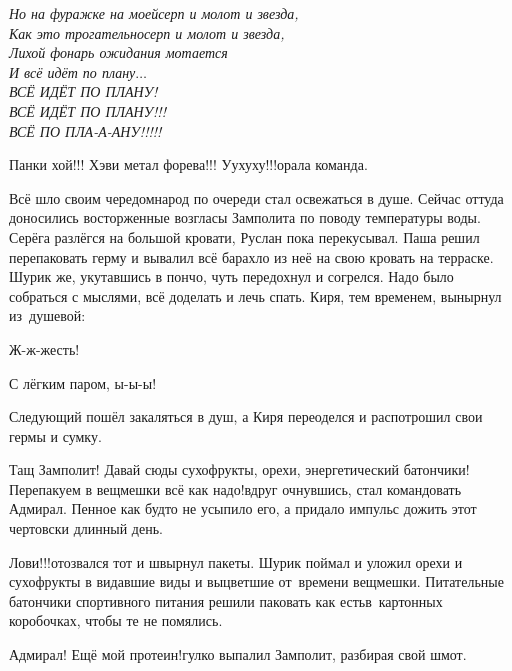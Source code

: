 \vspace{0.1cm}
\noindent\textit{%
	\hspace*{1.2cm}Но на фуражке на моей\mdash серп и молот и звезда,\\
	\hspace*{1.2cm}Как это трогательно\mdash серп и молот и звезда,\\
	\hspace*{1.2cm}Лихой фонарь ожидания мотается\\
	\hspace*{1.2cm}И всё идёт по плану$\ldots$\\
	\hspace*{1.2cm}\large{ВСЁ ИДЁТ ПО ПЛАНУ!}\\
	\hspace*{1.2cm}\Large{ВСЁ ИДЁТ ПО ПЛАНУ!!!}\\
	\hspace*{1.2cm}\LARGE{ВСЁ ПО ПЛА-А-АНУ!!!!!}
}

\newpage
\diagdash Панки хой!!! Хэви метал форева!!! У\sdash у\sdash х\sdash у\sdash х\sdash у!!!\mdash орала команда.

Всё шло своим чередом\mdash народ по очереди стал освежаться в душе. Сейчас оттуда доносились восторженные возгласы Замполита по поводу температуры воды. Серёга разлёгся на большой кровати, Руслан пока перекусывал. Паша решил перепаковать герму и вывалил всё барахло из неё на свою кровать на терраске. Шурик же, укутавшись в пончо, чуть передохнул и согрелся. Надо было собраться с мыслями, всё доделать и лечь спать. Киря, тем временем, вынырнул из~душевой:

\diagdash Ж-ж-жесть! 

\diagdash С лёгким паром, ы-ы-ы!

Следующий пошёл закаляться в душ, а Киря переоделся и распотрошил свои гермы и сумку. 

\diagdash Тащ Замполит! Давай сюды сухофрукты, орехи, энергетический батончики! Перепакуем в вещмешки всё как надо!\mdash вдруг очнувшись, стал командовать Адмирал. Пенное как будто не усыпило его, а придало импульс дожить этот чертовски длинный день. 

\diagdash Лови!!!\mdash отозвался тот и швырнул пакеты. Шурик поймал и уложил орехи и сухофрукты в видавшие виды и выцветшие от~времени вещмешки. Питательные батончики спортивного питания решили паковать как есть\mdash в~картонных коробочках, чтобы те не помялись.

\diagdash Адмирал! Ещё мой протеин!\mdash гулко выпалил Замполит, разбирая свой шмот.

